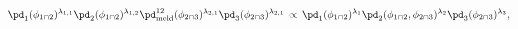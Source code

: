 \begin{equation}
  \pd_{1}(\phi_{1 \cap 2})^{\lambda_{1, 1}}
  \pd_{2}(\phi_{1 \cap 2})^{\lambda_{1, 2}}
  \pd_{\text{meld}}^{12}(\phi_{2 \cap 3})^{\lambda_{2, 1}}
  \pd_{3}(\phi_{2 \cap 3})^{\lambda_{2, 1}}
  \, \propto \,
  \pd_{1}(\phi_{1 \cap 2})^{\lambda_{1}} 
  \pd_{2}(\phi_{1 \cap 2}, \phi_{2 \cap 3})^{\lambda_{2}} 
  \pd_{3}(\phi_{2 \cap 3})^{\lambda_{3}},
  \label{eqn:pooling-equality-rhs-log}
\end{equation}